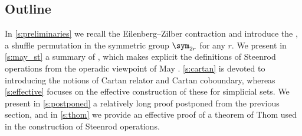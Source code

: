 
\subsection*{Outline}

In \cref{s:preliminaries} we recall the Eilenberg--Zilber contraction and introduce the , a shuffle permutation in the symmetric group $\sym_{2r}$ for any $r$.
We present in \cref{s:may_st} a summary of \cite{medina2021may_st}, which makes explicit the definitions of Steenrod operations \cite{steenrod1953cyclic} from the operadic viewpoint of May \cite{may1970general}.
\cref{s:cartan} is devoted to introducing the notions of Cartan relator and Cartan coboundary, whereas \cref{s:effective} focuses on the effective construction of these for simplicial sets.
We present in \cref{s:postponed} a relatively long proof postponed from the previous section, and in \cref{s:thom} we provide an effective proof of a theorem of Thom used in the construction of Steenrod operations.
